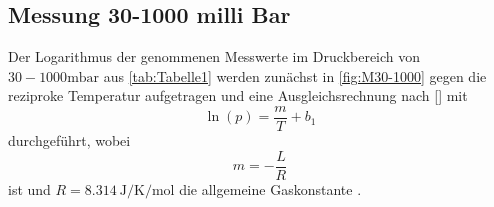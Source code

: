 \subsection{Messung 30-1000 milli Bar}
\label{subsec:M30-1000}
Der Logarithmus der genommenen Messwerte im Druckbereich von $30-1000\unit{\milli\bar}$ aus \autoref{tab:Tabelle1} werden zunächst in \autoref{fig:M30-1000}
gegen die reziproke Temperatur aufgetragen und eine Ausgleichsrechnung nach \eqref{} mit
\begin{equation}
  \ln\left(p\right) = \frac{m}{T} + b_1
\end{equation}
durchgeführt, wobei
\begin{equation*}
  m = -\frac{L}{R}
\end{equation*}
ist und $R =\SI{8,314}{\joule\per\kelvin\per\mol}$ die allgemeine Gaskonstante \cite{Gerth}.
